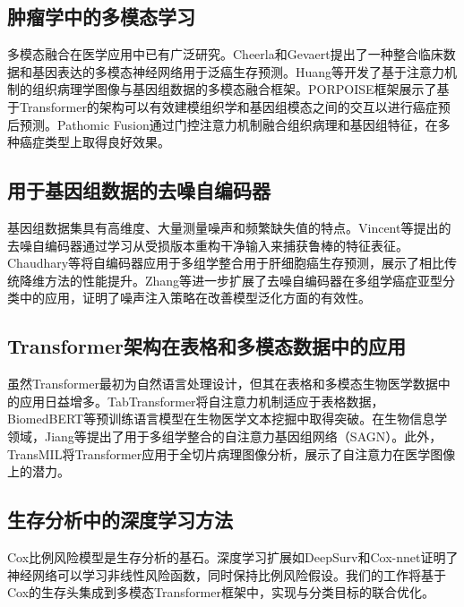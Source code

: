 \documentclass[conference]{IEEEtran}
\begin{document}
\subsection{肿瘤学中的多模态学习}

多模态融合在医学应用中已有广泛研究。Cheerla和Gevaert\cite{cheerla2019deep}提出了一种整合临床数据和基因表达的多模态神经网络用于泛癌生存预测。Huang等\cite{huang2021multi}开发了基于注意力机制的组织病理学图像与基因组数据的多模态融合框架。PORPOISE框架\cite{chen2022pan}展示了基于Transformer的架构可以有效建模组织学和基因组模态之间的交互以进行癌症预后预测。Pathomic Fusion\cite{chen2022pathomic}通过门控注意力机制融合组织病理和基因组特征，在多种癌症类型上取得良好效果。

\subsection{用于基因组数据的去噪自编码器}

基因组数据集具有高维度、大量测量噪声和频繁缺失值的特点。Vincent等\cite{vincent2008extracting}提出的去噪自编码器通过学习从受损版本重构干净输入来捕获鲁棒的特征表征。Chaudhary等\cite{chaudhary2018deep}将自编码器应用于多组学整合用于肝细胞癌生存预测，展示了相比传统降维方法的性能提升。Zhang等\cite{zhang2022multi}进一步扩展了去噪自编码器在多组学癌症亚型分类中的应用，证明了噪声注入策略在改善模型泛化方面的有效性。

\subsection{Transformer架构在表格和多模态数据中的应用}

虽然Transformer最初为自然语言处理设计，但其在表格和多模态生物医学数据中的应用日益增多。TabTransformer\cite{huang2020tabtransformer}将自注意力机制适应于表格数据，BiomedBERT\cite{lee2020biobert}等预训练语言模型在生物医学文本挖掘中取得突破。在生物信息学领域，Jiang等\cite{jiang2022self}提出了用于多组学整合的自注意力基因组网络（SAGN）。此外，TransMIL\cite{shao2021transmil}将Transformer应用于全切片病理图像分析，展示了自注意力在医学图像上的潜力。

\subsection{生存分析中的深度学习方法}

Cox比例风险模型\cite{cox1972regression}是生存分析的基石。深度学习扩展如DeepSurv\cite{katzman2018deepsurv}和Cox-nnet\cite{ching2018cox}证明了神经网络可以学习非线性风险函数，同时保持比例风险假设。我们的工作将基于Cox的生存头集成到多模态Transformer框架中，实现与分类目标的联合优化。
\end{document}
